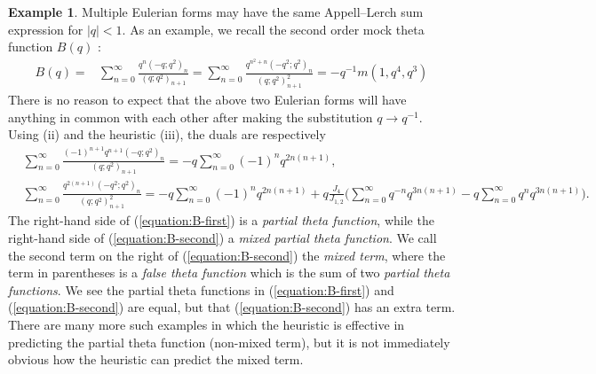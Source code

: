 \documentclass[12pt,reqno]{amsart}
\theoremstyle{remark}
\theoremstyle{definition}
\newtheorem{example}{Example}
\numberwithin{theorem}{section} \numberwithin{equation}{section}
\numberwithin{example}{section}
\begin{document}
\begin{example}\label{example:ex-1}Multiple Eulerian forms may have the same Appell--Lerch sum expression for $|q|<1$.  As an example, we recall the second order mock theta function $B(q)$ \cite{HM}:
\begin{align}
B(q)=&\sum_{n= 0}^{\infty}\frac{q^{n}(-q;q^2)_n}{(q;q^2)_{n+1}}=\sum_{n=0}^{\infty}\frac{q^{n^2+n}(-q^2;q^2)_n}{(q;q^2)_{n+1}^2}=-q^{-1}m(1,q^4,q^3)
\end{align}
There is no reason to expect that the above two Eulerian forms will have anything in common with each other after making the substitution $q\rightarrow q^{-1}$.  Using (ii) and the heuristic (iii), the duals are respectively
{\allowdisplaybreaks \begin{align}
& \sum_{n= 0}^{\infty}\frac{(-1)^{n+1}q^{n+1}(-q;q^2)_n}{(q;q^2)_{n+1}}=-q\sum_{n=0}^{\infty}(-1)^{n}q^{2n(n+1)},\label{equation:B-first}\\
 &\sum_{n= 0}^{\infty}\frac{q^{2(n+1)}(-q^2;q^2)_n}{(q;q^2)_{n+1}^2}=-q\sum_{n=0}^{\infty}(-1)^{n}q^{2n(n+1)}
 +q\frac{J_4}{J_{1,2}}\Big (  \sum_{n=0}^{\infty}q^{-n}q^{3n(n+1)}-q\sum_{n=0}^{\infty}q^{n}q^{3n(n+1)}\Big ).\label{equation:B-second}
\end{align}}The right-hand side  of (\ref{equation:B-first}) is a {\em partial theta function}, while the right-hand side of (\ref{equation:B-second}) a {\em mixed partial theta function}.  We call the second term on the right of (\ref{equation:B-second}) the {\em mixed term}, where the term in parentheses is a {\em false theta function} which is the sum of two {\em partial theta functions}.  We see the partial theta functions in (\ref{equation:B-first}) and (\ref{equation:B-second}) are equal, but that (\ref{equation:B-second}) has an extra term.  There are many more such examples in which the heuristic  is effective in predicting the partial theta function (non-mixed term), but it is not immediately obvious how the heuristic can predict the mixed term.
\end{example}
\end{document}
